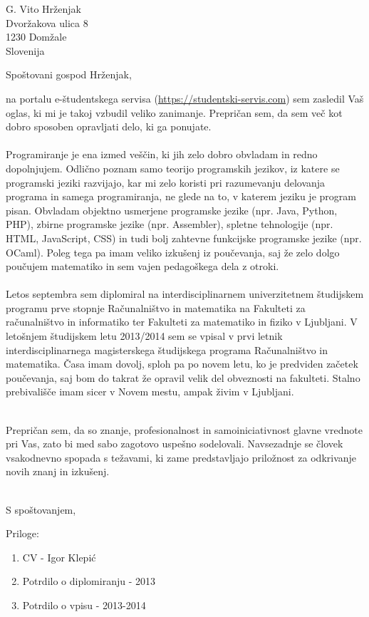 \documentclass[a4paper]{scrlttr2}
\begin{document}
 
\begin{letter}{G. Vito Hrženjak \\ Dvoržakova ulica 8 \\ 1230 Domžale \\ Slovenija}
 

\opening{Spoštovani gospod Hrženjak,}
 
na portalu e-študentskega servisa (\url{https://studentski-servis.com}) sem zasledil Vaš oglas, ki mi je takoj vzbudil veliko zanimanje. Prepričan sem, da sem več kot dobro sposoben opravljati delo, ki ga ponujate. 
\\
\\
Programiranje je ena izmed veščin, ki jih zelo dobro obvladam in redno dopolnjujem. Odlično poznam samo teorijo programskih jezikov, iz katere se programski jeziki razvijajo, kar mi zelo koristi pri razumevanju delovanja programa in samega programiranja, ne glede na to, v katerem jeziku je program pisan. Obvladam objektno usmerjene programske jezike (npr. Java, Python, PHP), zbirne programske jezike (npr. Assembler), spletne tehnologije (npr. HTML, JavaScript, CSS) in tudi bolj zahtevne funkcijske programske jezike (npr. OCaml). Poleg tega pa imam veliko izkušenj iz poučevanja, saj že zelo dolgo poučujem matematiko in sem vajen pedagoškega dela z otroki. 
\\
\\
Letos septembra sem diplomiral na interdisciplinarnem univerzitetnem študijskem programu prve stopnje Računalništvo in matematika na Fakulteti za računalništvo in informatiko ter Fakulteti za matematiko in fiziko v Ljubljani. V letošnjem študijskem letu 2013/2014 sem se vpisal v prvi letnik interdisciplinarnega magisterskega študijskega programa Računalništvo in matematika. Časa imam dovolj, sploh pa po novem letu, ko je predviden začetek poučevanja, saj bom do takrat že opravil velik del obveznosti na fakulteti. Stalno prebivališče imam sicer v Novem mestu, ampak živim v Ljubljani. 
\\
\\
\newpage

Prepričan sem, da so znanje, profesionalnost in samoiniciativnost glavne vrednote pri Vas, zato bi med sabo zagotovo uspešno sodelovali. Navsezadnje se človek vsakodnevno spopada s težavami, ki zame predstavljajo priložnost za odkrivanje novih znanj in izkušenj.
\\
\\
\closing{S spoštovanjem,}

\vspace{10mm}

Priloge: \\
\begin{enumerate}
\item CV - Igor Klepić
\item Potrdilo o diplomiranju - 2013
\item Potrdilo o vpisu - 2013-2014
\end{enumerate}


 
\end{letter}
 
\end{document}
